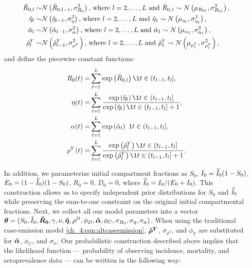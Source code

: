 \begin{equation}
\begin{aligned}
	\tilde{R}_{0,l} \sim& N\left(\tilde{R}_{0, l - 1}, \sigma_{R_0}^2\right)\text{, where } l=2,\ldots,L \text{ and } \tilde{R}_{0,1} \sim N\left(\mu_{R_{01}},\sigma^2_{R_{01}}\right),\\
	\tilde{\eta}_{l} \sim& N\left(\tilde{\eta}_{l - 1}, \sigma_\eta^2\right)\text{, where } l=2,\ldots,L \text{ and } \tilde{\eta}_1 \sim N\left(\mu_{\eta_1}, \sigma^2_{\eta_1}\right),\\
	\tilde{\alpha}_{l} \sim& N\left(\tilde{\alpha}_{l - 1}, \sigma_\alpha^2\right)\text{, where } l=2,\ldots,L \text{ and } \tilde{\alpha}_1 \sim N\left(\mu_{\alpha_1},\sigma^2_{\alpha_1}\right),\\
	\tilde{\rho}^Y_{l} \sim& N\left(\tilde{\rho}^Y_{l - 1}, \sigma_{\rho^Y}^2\right)\text{, where } l=2,\ldots,L \text{ and } \tilde{\rho}^Y_1 \sim N\left(\mu_{\rho^Y_1}, \sigma^2_{\rho^Y_1}\right),
 \label{ch_4:eqn:GMRF}
\end{aligned}
\end{equation}
and define the piecewise constant functions:
\begin{align}
	R_0(t) =& \sum_{l=1}^L \exp{\left( \tilde{R}_{0,l} \right) \1{t \in (t_{l-1}, t_l]}},\\
	\eta(t) =& \sum_{l=1}^L \frac{\exp{ \left(\etatilde_l\right) \1{t \in (t_{l-1}, t_l]} }}{\exp{\left( \etatilde_l \right) \1{t \in (t_{l-1}, t_l]}} + 1},\\
	\alpha(t) =& \sum_{l=1}^L \exp{\left( \alphatilde_l \right)\ 1{t \in (t_{l-1}, t_l]} },\\
	\rho^Y(t) =& \sum_{l=1}^L \frac{\exp{\left( \rhoytilde_l \right) \1{t \in (t_{l-1}, t_l]} }}{\exp{\left( \rhoytilde_l \right) \1{t \in (t_{l-1}, t_l]} } + 1}.
\end{align}

In addition, we parameterize initial compartment fractions as $ S_0 $, $ I_0 = \widetilde{I}_0(1 - S_0) $, $ E_0 = (1 - \widetilde{I}_0)(1 - S_0) $, $R_0 = 0$, $D_0 = 0$, where $\widetilde{I}_0 = I_0 / (E_0 + I_0)$.
This construction allows us to specify independent prior distributions for $S_0$ and $\widetilde{I}_0$ while preserving the sum-to-one constraint on the original initial compartmental fractions.
Next, we collect all our model parameters into a vector $\boldsymbol{\theta} = (S_0,  \tilde{I}_{0}, \boldsymbol{\tilde{R}_0}, \gamma, \nu, \boldsymbol{\tilde{\eta}}, \rho^D, \phi_D, \boldsymbol{\tilde{\alpha}}, \phi_C, \sigma_{R_0}, \sigma_\eta, \sigma_\alpha)$.
When using the traditional case-emission model \eqref{ch_4:eqn:altcaseemission}, $ \boldsymbol{\tilde{\rho}^Y} $,  $ \sigma_{\rho^Y} $, and $\phi_Y $ are substituted for $ \boldsymbol{\tilde{\alpha}} $, $ \phi_C $, and $ \sigma_\alpha $.
Our probabilistic construction described above implies that the likelihood function --- probability of observing incidence, mortality, and seroprevalence data --- can be written in the following way:

